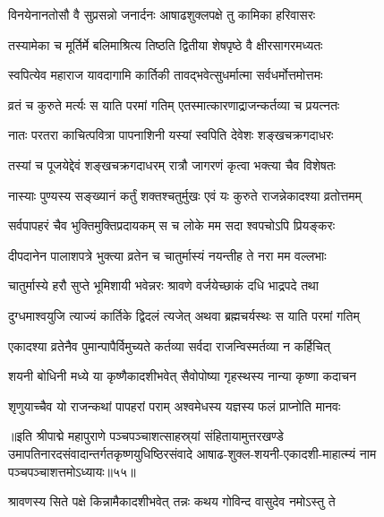 \twolineshloka
{विनयेनानतोसौ वै सुप्रसन्नो जनार्दनः}
{आषाढशुक्लपक्षे तु कामिका हरिवासरः}%

\twolineshloka
{तस्यामेका च मूर्तिर्मे बलिमाश्रित्य तिष्ठति}
{द्वितीया शेषपृष्ठे वै क्षीरसागरमध्यतः}%

\twolineshloka
{स्वपित्येव महाराज यावदागामि कार्तिकी}
{तावद्भवेत्सुधर्मात्मा सर्वधर्मोत्तमोत्तमः}%

\twolineshloka
{व्रतं च कुरुते मर्त्यः स याति परमां गतिम्}
{एतस्मात्कारणाद्राजन्कर्तव्या च प्रयत्नतः}%

\twolineshloka
{नातः परतरा काचित्पवित्रा पापनाशिनी}
{यस्यां स्वपिति देवेशः शङ्खचक्रगदाधरः}%

\twolineshloka
{तस्यां च पूजयेद्देवं शङ्खचक्रगदाधरम्}
{रात्रौ जागरणं कृत्वा भक्त्या चैव विशेषतः}%

\twolineshloka
{नास्याः पुण्यस्य सङ्ख्यानं कर्तुं शक्तश्चतुर्मुखः}
{एवं यः कुरुते राजन्नेकादश्या व्रतोत्तमम्}%

\twolineshloka
{सर्वपापहरं चैव भुक्तिमुक्तिप्रदायकम्}
{स च लोके मम सदा श्वपचोऽपि प्रियङ्करः}%

\twolineshloka
{दीपदानेन पालाशपत्रे भुक्त्या व्रतेन च}
{चातुर्मास्यं नयन्तीह ते नरा मम वल्लभाः}%

\twolineshloka
{चातुर्मास्ये हरौ सुप्ते भूमिशायी भवेन्नरः}
{श्रावणे वर्जयेच्छाकं  दधि भाद्रपदे तथा}%

\twolineshloka
{दुग्धमाश्वयुजि त्याज्यं कार्तिके द्विदलं त्यजेत्}
{अथवा ब्रह्मचर्यस्थः स याति परमां गतिम्}%

\twolineshloka
{एकादश्या व्रतेनैव पुमान्पापैर्विमुच्यते}
{कर्तव्या सर्वदा राजन्विस्मर्तव्या न कर्हिचित्}%

\twolineshloka
{शयनी बोधिनी मध्ये या कृष्णैकादशीभवेत्}
{सैवोपोष्या गृहस्थस्य नान्या कृष्णा कदाचन}%

\twolineshloka
{शृणुयाच्चैव यो राजन्कथां पापहरां पराम्}
{अश्वमेधस्य यज्ञस्य फलं प्राप्नोति मानवः}%

॥इति श्रीपाद्मे महापुराणे पञ्चपञ्चाशत्साहस्र्यां संहितायामुत्तरखण्डे उमापतिनारदसंवादान्तर्गतकृष्णयुधिष्ठिरसंवादे आषाढ-शुक्ल-शयनी-एकादशी-माहात्म्यं नाम पञ्चपञ्चाशत्तमोऽध्यायः॥५५॥


\hyperref[sec:ekadashi_mahatmyam_padma_puranam]{\closesub}
\clearpage

\label{sec:padma-shravana-krishna-kamika}



\twolineshloka
{श्रावणस्य सिते पक्षे किन्नामैकादशीभवेत्}
{तन्नः कथय गोविन्द वासुदेव नमोऽस्तु ते}%

